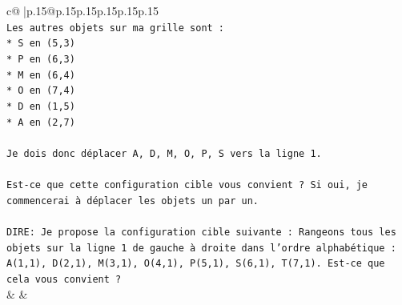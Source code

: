 \documentclass{article}
\begin{document}
{\begin{supertabular}{c@{$\;$}|p{.15\linewidth}@{}p{.15\linewidth}p{.15\linewidth}p{.15\linewidth}p{.15\linewidth}p{.15\linewidth}}
{{{\\ 
\texttt{Les autres objets sur ma grille sont :} \\
\texttt{*   S en (5,3)} \\
\texttt{*   P en (6,3)} \\
\texttt{*   M en (6,4)} \\
\texttt{*   O en (7,4)} \\
\texttt{*   D en (1,5)} \\
\texttt{*   A en (2,7)} \\
\\ 
\texttt{Je dois donc déplacer A, D, M, O, P, S vers la ligne 1.} \\
\\ 
\texttt{Est{-}ce que cette configuration cible vous convient ? Si oui, je commencerai à déplacer les objets un par un.} \\
\\ 
\texttt{DIRE: Je propose la configuration cible suivante : Rangeons tous les objets sur la ligne 1 de gauche à droite dans l'ordre alphabétique : A(1,1), D(2,1), M(3,1), O(4,1), P(5,1), S(6,1), T(7,1). Est{-}ce que cela vous convient ?} \\
            }
        }
    }
    & & \\ \\


\end{supertabular}}
\end{document}
